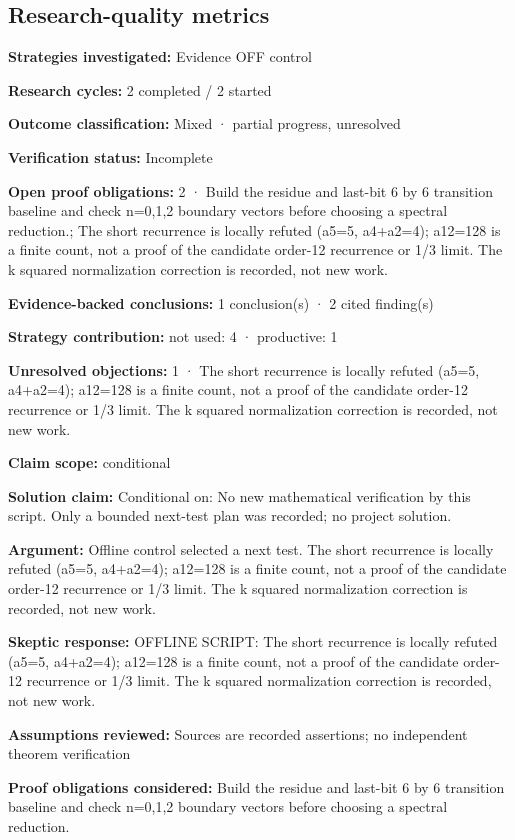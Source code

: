 \documentclass[11pt]{article}
\begin{document}
\subsection{Research-quality metrics}
\textbf{Strategies investigated:} Evidence OFF control\par
\textbf{Research cycles:} 2 completed / 2 started\par
\textbf{Outcome classification:} Mixed · partial progress, unresolved\par
\textbf{Verification status:} Incomplete\par
\textbf{Open proof obligations:} 2 · Build the residue and last-bit 6 by 6 transition baseline and check n=0,1,2 boundary vectors before choosing a spectral reduction.; The short recurrence is locally refuted (a5=5, a4+a2=4); a12=128 is a finite count, not a proof of the candidate order-12 recurrence or 1/3 limit. The k squared normalization correction is recorded, not new work.\par
\textbf{Evidence-backed conclusions:} 1 conclusion(s) · 2 cited finding(s)\par
\textbf{Strategy contribution:} not used: 4 · productive: 1\par
\textbf{Unresolved objections:} 1 · The short recurrence is locally refuted (a5=5, a4+a2=4); a12=128 is a finite count, not a proof of the candidate order-12 recurrence or 1/3 limit. The k squared normalization correction is recorded, not new work.\par
\textbf{Claim scope:} conditional\par
\textbf{Solution claim:} Conditional on: No new mathematical verification by this script. Only a bounded next-test plan was recorded; no project solution.\par
\textbf{Argument:} Offline control selected a next test. The short recurrence is locally refuted (a5=5, a4+a2=4); a12=128 is a finite count, not a proof of the candidate order-12 recurrence or 1/3 limit. The k squared normalization correction is recorded, not new work.\par
\textbf{Skeptic response:} OFFLINE SCRIPT: The short recurrence is locally refuted (a5=5, a4+a2=4); a12=128 is a finite count, not a proof of the candidate order-12 recurrence or 1/3 limit. The k squared normalization correction is recorded, not new work.\par
\textbf{Assumptions reviewed:} Sources are recorded assertions; no independent theorem verification\par
\textbf{Proof obligations considered:} Build the residue and last-bit 6 by 6 transition baseline and check n=0,1,2 boundary vectors before choosing a spectral reduction.\par
\end{document}
